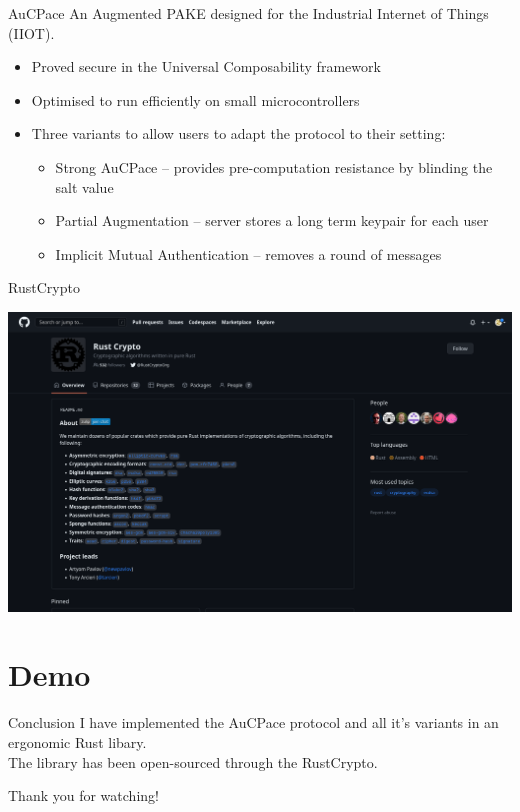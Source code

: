 \documentclass[hyperref={pdfpagemode=FullScreen}, aspectratio=169, 10pt]{beamer}
\begin{document}
\begin{frame}{AuCPace}
  An Augmented PAKE designed for the Industrial Internet of Things (IIOT).
  \begin{itemize}
    \item{Proved secure in the Universal Composability framework}
    \item{Optimised to run efficiently on small microcontrollers}
    \item{
      Three variants to allow users to adapt the protocol to their setting:
      \begin{itemize}
        \item{Strong AuCPace -- provides pre-computation resistance by blinding the salt value}
        \item{Partial Augmentation -- server stores a long term keypair for each user}
        \item{Implicit Mutual Authentication -- removes a round of messages}
      \end{itemize}
    }
  \end{itemize}
\end{frame}

\begin{frame}{RustCrypto}
  \begin{center}
    \includegraphics[width=0.9\linewidth]{rust_crypto_github.png}
  \end{center}
\end{frame}

\section{Demo}

\begin{frame}{Conclusion}
  I have implemented the AuCPace protocol and all it's variants in an ergonomic Rust libary.\\
  The library has been open-sourced through the RustCrypto.
\end{frame}

\begin{frame}[standout]
  Thank you for watching!
\end{frame}
\end{document}

